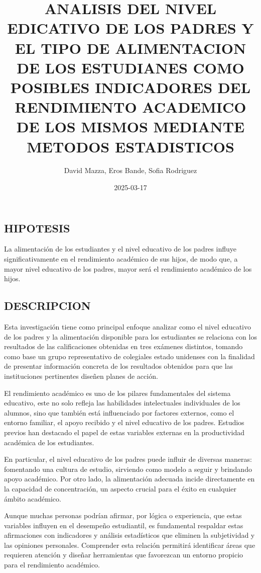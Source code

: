 \documentclass[
]{article}
\title{ANALISIS DEL NIVEL EDICATIVO DE LOS PADRES Y EL TIPO DE
ALIMENTACION DE LOS ESTUDIANES COMO POSIBLES INDICADORES DEL RENDIMIENTO
ACADEMICO DE LOS MISMOS MEDIANTE METODOS ESTADISTICOS}
\author{David Mazza, Eros Bande, Sofia Rodriguez}
\date{2025-03-17}
\begin{document}
\maketitle

\subsection{HIPOTESIS}\label{hipotesis}

La alimentación de los estudiantes y el nivel educativo de los padres
influye significativamente en el rendimiento académico de sus hijos, de
modo que, a mayor nivel educativo de los padres, mayor será el
rendimiento académico de los hijos.

\subsection{DESCRIPCION}\label{descripcion}

Esta investigación tiene como principal enfoque analizar como el nivel
educativo de los padres y la alimentación disponible para los
estudiantes se relaciona con los resultados de las calificaciones
obtenidas en tres exámenes distintos, tomando como base un grupo
representativo de colegiales estado unidenses con la finalidad de
presentar información concreta de los resultados obtenidos para que las
instituciones pertinentes diseñen planes de acción.

El rendimiento académico es uno de los pilares fundamentales del sistema
educativo, este no solo refleja las habilidades intelectuales
individuales de los alumnos, sino que también está influenciado por
factores externos, como el entorno familiar, el apoyo recibido y el
nivel educativo de los padres. Estudios previos han destacado el papel
de estas variables externas en la productividad académica de los
estudiantes.

En particular, el nivel educativo de los padres puede influir de
diversas maneras: fomentando una cultura de estudio, sirviendo como
modelo a seguir y brindando apoyo académico. Por otro lado, la
alimentación adecuada incide directamente en la capacidad de
concentración, un aspecto crucial para el éxito en cualquier ámbito
académico.

Aunque muchas personas podrían afirmar, por lógica o experiencia, que
estas variables influyen en el desempeño estudiantil, es fundamental
respaldar estas afirmaciones con indicadores y análisis estadísticos que
eliminen la subjetividad y las opiniones personales. Comprender esta
relación permitirá identificar áreas que requieren atención y diseñar
herramientas que favorezcan un entorno propicio para el rendimiento
académico.
\end{document}
